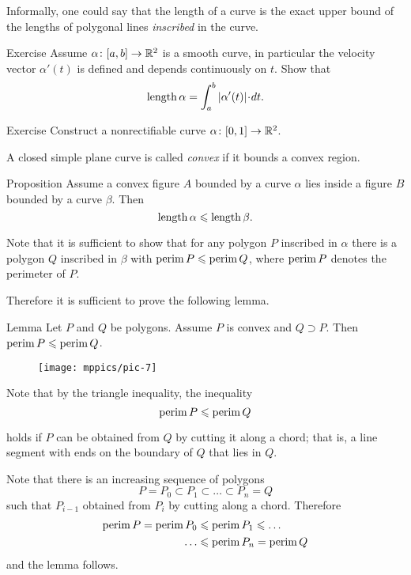 Informally, one could say that the length of a curve is the exact upper bound of the lengths of polygonal lines \emph{inscribed} in the curve.

\begin{thm}{Exercise}
Assume $\alpha\colon[a,b]\to\mathbb{R}^2$ is a smooth curve, in particular the velocity vector $\alpha'(t)$ is defined and depends continuously on $t$.
Show that
\[\length \alpha=\int_a^b|\alpha'(t)|\cdot dt.\]
\end{thm}

\begin{thm}{Exercise}\label{ex:nonrectifiable-curve}
Construct a nonrectifiable curve $\alpha\colon[0,1]\to\mathbb{R}^2$.
\end{thm}

A closed simple plane curve is called \emph{convex} if it bounds a convex region.

\begin{thm}{Proposition}\label{prop:convex-curve}
Assume a convex figure $A$ bounded by a curve $\alpha$ lies inside a figure $B$ bounded by a curve $\beta$.
Then
\[\mathop{\rm length}\nolimits\alpha\leqslant \mathop{\rm length}\nolimits\beta.\]
\end{thm}

Note that it is sufficient to show that for any polygon  $P$ inscribed in $\alpha$ there is a polygon $Q$ inscribed in $\beta$ with 
$\mathop{\rm perim}\nolimits P\leqslant \mathop{\rm perim}\nolimits Q$, where $\mathop{\rm perim}\nolimits P$ denotes the perimeter of $P$.

Therefore it is sufficient to prove the following lemma.


\begin{thm}{Lemma}\label{lem:perimeter}
Let $P$ and $Q$ be polygons.
Assume $P$ is convex and $Q\supset P$.
Then $\mathop{\rm perim}\nolimits P\leqslant \mathop{\rm perim}\nolimits Q$.
\end{thm}


\begin{wrapfigure}{r}{24 mm}
\vskip-4mm
\centering
\texttt{[image: mppics/pic-7]}
\end{wrapfigure}

Note that by the triangle inequality,
the inequality
\[\mathop{\rm perim}\nolimits P\leqslant \mathop{\rm perim}\nolimits Q\]

holds
if $P$ can be obtained from $Q$ by cutting it along a chord;
that is, a line segment with ends on the boundary of $Q$ that lies in $Q$.


Note that there is an increasing sequence of polygons 
$$P=P_0\subset P_1\subset\dots\subset P_n=Q$$
such that $P_{i-1}$ obtained from $P_{i}$ by cutting along a chord.
Therefore 
\begin{align*}
\mathop{\rm perim}\nolimits P=\mathop{\rm perim}\nolimits P_0&\leqslant\mathop{\rm perim}\nolimits P_1\leqslant\dots
\\
\dots&\leqslant\mathop{\rm perim}\nolimits P_n=\mathop{\rm perim}\nolimits Q
\end{align*}
and the lemma follows.
\qeds

